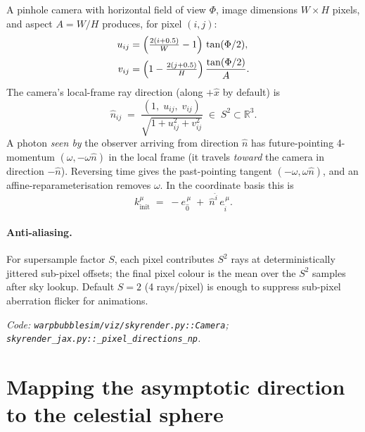 \documentclass[11pt]{article}
\newcommand{\R}{\mathbb{R}}
\begin{document}
A pinhole camera with horizontal field of view $\Phi$, image dimensions
$W\!\times\!H$ pixels, and aspect $A=W/H$ produces, for pixel $(i,j)$:
\begin{align}
u_{ij} &= \Bigl(\tfrac{2(i+0.5)}{W} - 1\Bigr)\,\tan(\Phi/2),\\
v_{ij} &= \Bigl(1 - \tfrac{2(j+0.5)}{H}\Bigr)\,\frac{\tan(\Phi/2)}{A}.
\end{align}
The camera's local-frame ray direction (along $+\hat x$ by default) is
\begin{equation}
\hat n_{ij} \;=\; \frac{(1,\;u_{ij},\;v_{ij})}{\sqrt{1+u_{ij}^2+v_{ij}^2}} \;\in\; S^2 \subset \R^3.
\end{equation}
A photon \emph{seen by} the observer arriving from direction $\hat n$ has
future-pointing 4-momentum $(\omega, -\omega\hat n)$ in the local frame
(it travels \emph{toward} the camera in direction $-\hat n$).  Reversing
time gives the past-pointing tangent $(-\omega, \omega\hat n)$, and an
affine-reparameterisation removes $\omega$.  In the coordinate basis this
is
\begin{equation}
\boxed{\quad
k^\mu_{\text{init}} \;=\; -e_{\hat 0}^{\,\mu} \;+\; \hat n^{\hat i}\,e_{\hat i}^{\,\mu}.
\quad}
\label{eq:k-init}
\end{equation}

\paragraph{Anti-aliasing.}
For supersample factor $S$, each pixel contributes $S^2$ rays at
deterministically jittered sub-pixel offsets; the final pixel colour is
the mean over the $S^2$ samples after sky lookup.  Default $S=2$ (4
rays/pixel) is enough to suppress sub-pixel aberration flicker for
animations.

\smallskip
\noindent\emph{Code: \texttt{warpbubblesim/viz/skyrender.py::Camera}; \texttt{skyrender\_jax.py::\_pixel\_directions\_np}.}

\section{Mapping the asymptotic direction to the celestial sphere}
\end{document}
